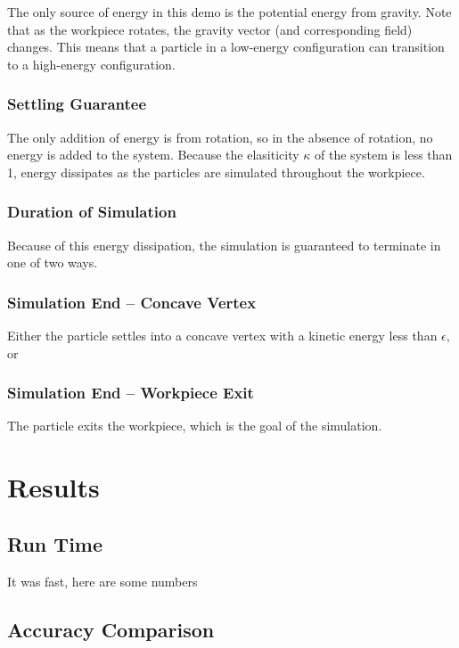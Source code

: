 		The only source of energy in this demo is the potential energy from gravity. Note that as the workpiece rotates, the gravity vector (and corresponding field) changes. This means that a particle in a low-energy configuration can transition to a high-energy configuration.

		\subsubsection{Settling Guarantee}

		The only addition of energy is from rotation, so in the absence of rotation, no energy is added to the system. Because the elasiticity $\kappa$ of the system is less than 1, energy dissipates as the particles are simulated throughout the workpiece.

		\subsubsection{Duration of Simulation}

		Because of this energy dissipation, the simulation is guaranteed to terminate in one of two ways.

		\subsubsection{Simulation End -- Concave Vertex}

		Either the particle settles into a concave vertex with a kinetic energy less than $\epsilon$, or

		\subsubsection{Simulation End -- Workpiece Exit}

		The particle exits the workpiece, which is the goal of the simulation.

\section{Results}

	\subsection{Run Time}

	It was fast, here are some numbers

	\subsection{Accuracy Comparison}

